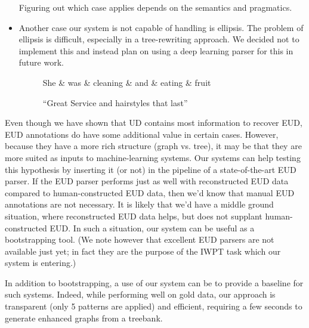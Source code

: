 \documentclass[11pt,a4paper]{article}
\begin{document}
\begin{itemize}
  Figuring out which case applies depends on the semantics and
  pragmatics.
\item Another case our system is not capable of handling is
 ellipsis. The problem of ellipsis is difficult, especially in a
 tree-rewriting approach. We decided not to implement this and
 instead plan on using a deep learning parser for this in future
 work.

\begin{figure}[h]
    \centering
    \begin{dependency}
    \begin{deptext}[column sep=0.1cm]
    She \& was \& cleaning \& and \& eating \& fruit  \\
    \end{deptext}
    \end{dependency}
    \caption{``Great Service and hairstyles that last''}
    \label{fig:aclrecl}
\end{figure}

\end{itemize}

Even though we have shown that UD contains most information to recover
EUD, EUD annotations do have some additional value in certain
cases. However, because they have a more rich structure (graph
vs. tree), it may be that they are more suited as inputs to
machine-learning systems. Our systems can help testing this hypothesis
by inserting it (or not) in the pipeline of a state-of-the-art EUD
parser. If the EUD parser performs just as well with reconstructed EUD
data compared to human-constructed EUD data, then we'd know that
manual EUD annotations are not necessary.  It is likely that we'd have
a middle ground situation, where reconstructed EUD data helps, but
does not supplant human-constructed EUD. In such a situation, our
system can be useful as a bootstrapping tool. (We note however that
excellent EUD parsers are not available just yet; in fact they are the
purpose of the IWPT task which our system is entering.)

In addition to bootstrapping, a use of our system can be to provide a
baseline for such systems.  Indeed, while performing well on gold
data, our approach is transparent (only 5 patterns are applied) and
efficient, requiring a few seconds to generate enhanced graphs from a
treebank.
\end{document}
